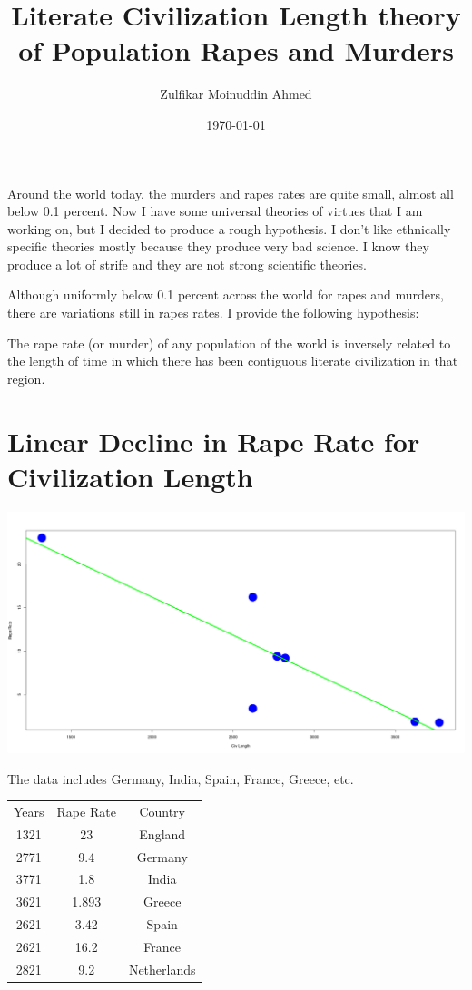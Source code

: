 \documentclass{amsart}
\title{Literate Civilization Length theory of Population Rapes and Murders}
\author{Zulfikar Moinuddin Ahmed}
\date{\today}
\begin{document}
\maketitle
Around the world today, the murders and rapes rates are quite small, almost all below 0.1 percent.  Now I have some universal theories of virtues that I am working on, but I decided to produce a rough hypothesis.  I don't like ethnically specific theories mostly because they produce very bad science.  I know they produce a lot of strife and they are not strong scientific theories.

Although uniformly below 0.1 percent across the world for rapes and murders, there are variations still in rapes rates.  I provide the following hypothesis:

The rape rate (or murder) of any population of the world is inversely related to the length of time in which there has been contiguous literate civilization in that region.  

\section{Linear Decline in Rape Rate for Civilization Length}

\includegraphics[scale=0.25]{rcl.jpg}

The data includes Germany, India, Spain, France, Greece, etc. 
\begin{center}
	\begin{tabular}{ |c | c | c | }
	\hline
Years	& Rape Rate &	Country \\
1321 & 23 & England\\
2771 & 9.4 & Germany \\
3771 & 1.8 & India \\
3621 & 1.893 & Greece\\
2621 & 3.42 & Spain\\
2621 & 16.2 & France\\
2821 & 9.2 & Netherlands \\
	\hline
	\end{tabular}
\end{center}
\end{document}
